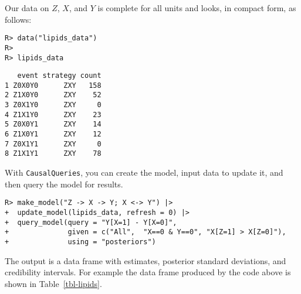 \documentclass[
  11pt,
  article]{jss}
\begin{document}
Our data on \(Z\), \(X\), and \(Y\) is complete for all units and looks,
in compact form, as follows:

\begin{verbatim}
R> data("lipids_data")
R> 
R> lipids_data
\end{verbatim}

\begin{verbatim}
   event strategy count
1 Z0X0Y0      ZXY   158
2 Z1X0Y0      ZXY    52
3 Z0X1Y0      ZXY     0
4 Z1X1Y0      ZXY    23
5 Z0X0Y1      ZXY    14
6 Z1X0Y1      ZXY    12
7 Z0X1Y1      ZXY     0
8 Z1X1Y1      ZXY    78
\end{verbatim}

With \texttt{CausalQueries}, you can create the model, input data to
update it, and then query the model for results.

\begin{verbatim}
R> make_model("Z -> X -> Y; X <-> Y") |>
+  update_model(lipids_data, refresh = 0) |>
+  query_model(query = "Y[X=1] - Y[X=0]",
+              given = c("All",  "X==0 & Y==0", "X[Z=1] > X[Z=0]"),
+              using = "posteriors") 
\end{verbatim}

\hypertarget{tbl-lipids}{}
\begin{table}
\caption{\label{tbl-lipids}Replication of \citet{chickering1996clinician}. }\tabularnewline

\centering
{}
\end{table}

The output is a data frame with estimates, posterior standard
deviations, and credibility intervals. For example the data frame
produced by the code above is shown in Table~\ref{tbl-lipids}.
\end{document}
